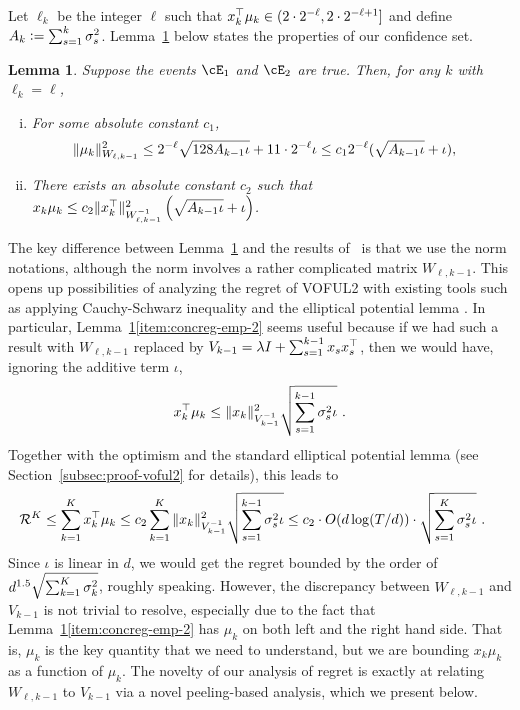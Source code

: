 \documentclass{article}
\newtheorem{lemma}{Lemma}
\newcommand{\blue}[1]{{\color[rgb]{.3,.5,1}#1}}
\renewcommand{\blue}[1]{#1}
\begin{document}
Let $\blue{\ell_k}$ be the integer $\ell$ such that $x_k^{\top}\mu_k \in (2 \cdot 2^{-\ell}, 2 \cdot 2^{-\ell+1}]$ and define $\blue{A_{k}} := \sum_{s=1}^k \sig_s^{2}$.
Lemma~\ref{lem:concreg-emp} below states the properties of our confidence set. 
%
\def\const{\mathsf{const}}
\begin{lemma}
  \label{lem:concreg-emp}
  Suppose the events $\cE_1$ and $\cE_2$ are true.
  Then, for any $k$ with $\ell_k = \ell$,
  \begin{enumerate}[(i)]
    \item \label{item:concreg-emp-1} 
    For some absolute constant $c_1$,
    \begin{align*}
    \|\mu_k\|_{W_{\ell,k-1}}^2 
    &\le 2^{-\ell}\sqrt{128 A_{k-1} \iota}   + 11\cdot 2^{-\ell}\iota \le c_1 2^{-\ell} (\sqrt{A_{k-1} \iota} + \iota ),
    \end{align*}

    \item \label{item:concreg-emp-2} There exists an absolute constant $c_2$ such that $x_k \mu_k \le c_2  \|x_k^\T\|^{2}_{W^{-1}_{\ell,k-1}} \del{ \sqrt{ A_{k-1} \iota} + \iota} $.
  \end{enumerate}
\end{lemma}
The key difference between Lemma~\ref{lem:concreg-emp} and the results of~\citet{zhang21variance} is that we use the norm notations, although the norm involves a rather complicated matrix $W_{\ell,k-1}$.
This opens up possibilities of analyzing the regret of VOFUL2 with existing tools such as applying Cauchy-Schwarz inequality and the elliptical potential lemma \cite{ay11improved, cesa2006prediction,lattimore20bandit}.
In particular, Lemma~\ref{lem:concreg-emp}\ref{item:concreg-emp-2} seems useful because if we had such a result with $W_{\ell,k-1}$ replaced by $V_{k-1}= {\lambda} I + \sum_{s=1}^{k-1} x_s x_s^{\top}$, then we would have, ignoring the additive term $\iota$,
\begin{align*}
    x_k^{\top} \mu_k \le \|x_k\|^2_{{V}^{-1}_{k-1}} \sqrt{\sum_{s=1}^{k-1} \sigma_s^2 \iota} ~.
\end{align*}
Together with the optimism and the  standard elliptical potential lemma (see Section~\ref{subsec:proof-voful2} for details), this leads to 
\begin{align*}
    \mathcal{R}^K 
    &\le \sum_{k=1}^K x_k^{\top} \mu_k
    \le c_2 \sum_{k=1}^K \|x_k\|^2_{{V}^{-1}_{k-1}} \sqrt{\sum_{s=1}^{k-1} \sigma_s^2 \iota}
    \leq c_2 \cdot O(d\log(T/d))\cdot \sqrt{\sum_{s=1}^{K} \sigma_s^2 \iota}~.
\end{align*}
Since $\iota$ is linear in $d$, we would get the regret bounded by the order of $d^{1.5}\sqrt{\sum_{k=1}^K \sigma_k^2}$, roughly speaking.
However, the discrepancy between $W_{\ell,k-1}$ and $V_{k-1}$ is not trivial to resolve, especially due to the fact that Lemma~\ref{lem:concreg-emp}\ref{item:concreg-emp-2} has $\mu_k$ on both left and the right hand side.
That is, $\mu_k$ is the key quantity that we need to understand, but we are bounding $x_k \mu_k$ as a function of $\mu_k$.
The novelty of our analysis of regret is exactly at relating $W_{\ell,k-1}$ to $V_{k-1}$ via a novel peeling-based analysis, which we present below.
\end{document}
